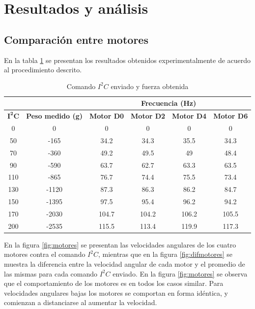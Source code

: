 \documentclass[main]{subfiles}
\begin{document}
\section{Resultados y an\'alisis}

\subsection{Comparaci\'on entre motores}
\label{sec:motores} 

En la tabla \ref{tab:motores} se presentan los resultados obtenidos experimentalmente de acuerdo al procedimiento descrito. 


\begin{table}[H]
\centering
\begin{tabular}{|c|c|c|c|c|c|} 
	\cline{3-6} \multicolumn{1}{c}{} & \multicolumn{1}{c}{} & 
	\multicolumn{4}{|c|}{\cellcolor[gray]{0.6}Frecuencia (Hz)} \\ \hline
	\cellcolor[gray]{0.8} {$\mathbf{I^2C}$} & 
	\cellcolor[gray]{0.8} \textbf{Peso medido (g)} &
	\cellcolor[gray]{0.8} \textbf{Motor D0} &
	\cellcolor[gray]{0.8} \textbf{Motor D2} &
	\cellcolor[gray]{0.8} \textbf{Motor D4} &
	\cellcolor[gray]{0.8} \textbf{Motor D6}   \\ \hline \hline
	  0 &      0 &    0 &    0 &    0 &    0 \\ \hline
	 50 &-165 & 34.2 & 34.3 & 35.5 & 34.3 \\ \hline
	 70 &-360 & 49.2 & 49.5 &   49 & 48.4 \\ \hline
	 90 & -590 & 63.7 & 62.7 & 63.3 & 63.5 \\ \hline
	110 & -865 & 76.7 & 74.4 & 75.5 & 73.4 \\ \hline
	130 &  -1120 & 87.3 & 86.3 & 86.2 & 84.7 \\ \hline
	150 & -1395 & 97.5 & 95.4 & 96.2 & 94.2 \\ \hline
	170 & -2030 &104.7 &104.2 &106.2 &105.5 \\ \hline
	200 & -2535 &115.5 &113.4 &119.9 &117.3 \\ \hline
\end{tabular}
\caption{Comando $I^2C$ enviado y fuerza obtenida}
\label{tab:motores}
\end{table}

En la figura \ref{fig:motores} se presentan las velocidades angulares de los cuatro motores contra el comando $I^2C$, mientras que en la figura \ref{fig:difmotores} se muestra la diferencia entre la velocidad angular de cada motor y el promedio de las mismas para cada comando $I^2C$ enviado. En la figura \ref{fig:motores} se observa que el comportamiento de los motores es en todos los casos similar. Para velocidades angulares bajas los motores se comportan en forma id\'entica, y comienzan a distanciarse al aumentar la velocidad.\\
 
\end{document}
